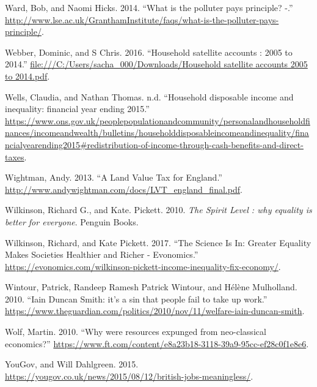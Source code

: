 \documentclass[]{tufte-handout}
\begin{document}
\leavevmode\hypertarget{ref-GranthamResearchInstituteonclimatechangeandtheenvironment2014}{}%
Ward, Bob, and Naomi Hicks. 2014. ``What is the polluter pays principle?
-.''
\url{http://www.lse.ac.uk/GranthamInstitute/faqs/what-is-the-polluter-pays-principle/}.

\leavevmode\hypertarget{ref-Webber2016}{}%
Webber, Dominic, and S Chris. 2016. ``Household satellite accounts :
2005 to 2014.''
\href{file:///C:/Users/sacha_000/Downloads/Household\%20satellite\%20accounts\%202005\%20to\%202014.pdf}{file:///C:/Users/sacha\_000/Downloads/Household satellite accounts 2005 to 2014.pdf}.

\leavevmode\hypertarget{ref-Wells}{}%
Wells, Claudia, and Nathan Thomas. n.d. ``Household disposable income
and inequality: financial year ending 2015.''
\url{https://www.ons.gov.uk/peoplepopulationandcommunity/personalandhouseholdfinances/incomeandwealth/bulletins/householddisposableincomeandinequality/financialyearending2015\#redistribution-of-income-through-cash-benefits-and-direct-taxes}.

\leavevmode\hypertarget{ref-Wightman2013}{}%
Wightman, Andy. 2013. ``A Land Value Tax for England.''
\url{http://www.andywightman.com/docs/LVT_england_final.pdf}.

\leavevmode\hypertarget{ref-Wilkinson2010}{}%
Wilkinson, Richard G., and Kate. Pickett. 2010. \emph{The Spirit Level :
why equality is better for everyone}. Penguin Books.

\leavevmode\hypertarget{ref-Wilkinson2017}{}%
Wilkinson, Richard, and Kate Pickett. 2017. ``The Science Is In: Greater
Equality Makes Societies Healthier and Richer - Evonomics.''
\url{https://evonomics.com/wilkinson-pickett-income-inequality-fix-economy/}.

\leavevmode\hypertarget{ref-PatrickWintour2010}{}%
Wintour, Patrick, Randeep Ramesh Patrick Wintour, and Hélène Mulholland.
2010. ``Iain Duncan Smith: it's a sin that people fail to take up
work.''
\url{https://www.theguardian.com/politics/2010/nov/11/welfare-iain-duncan-smith}.

\leavevmode\hypertarget{ref-Wolf2010}{}%
Wolf, Martin. 2010. ``Why were resources expunged from neo-classical
economics?''
\url{https://www.ft.com/content/e8a23b18-3118-39a9-95cc-ef28c0f1e8e6}.

\leavevmode\hypertarget{ref-YouGov2015}{}%
YouGov, and Will Dahlgreen. 2015.
\url{https://yougov.co.uk/news/2015/08/12/british-jobs-meaningless/}.
\end{document}
